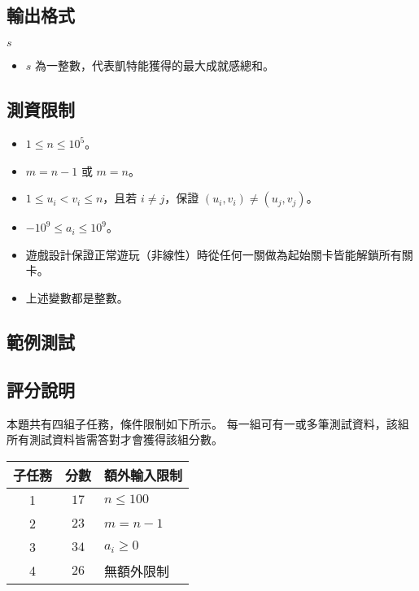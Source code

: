 \subsection{輸出格式}

\begin{format}
\f{
$s$
}
\end{format}

\begin{itemize}
\tightlist
\item
  \(s\) 為一整數，代表凱特能獲得的最大成就感總和。
\end{itemize}

\subsection{測資限制}

\begin{itemize}
\tightlist
\item
  \(1 \le n \le 10^5\)。
\item
  \(m = n-1\) 或 \(m = n\)。
\item
  \(1 \le u_i < v_i \le n\)，且若 \(i \ne j\)，保證
  \((u_i, v_i) \ne (u_j, v_j)\)。
\item
  \(-10^9 \le a_i \le 10^9\)。
\item
  遊戲設計保證正常遊玩（非線性）時從任何一關做為起始關卡皆能解鎖所有關卡。
\item
  上述變數都是整數。
\end{itemize}

\subsection{範例測試}

\begin{example}
%
%
\end{example}

\subsection{評分說明}

本題共有四組子任務，條件限制如下所示。
每一組可有一或多筆測試資料，該組所有測試資料皆需答對才會獲得該組分數。

\begin{longtable}[]{@{}ccl@{}}
\toprule
子任務 & 分數 & 額外輸入限制 \\
\midrule
\endhead
1 & \(17\) & \(n \le 100\) \\
2 & \(23\) & \(m = n-1\) \\
3 & \(34\) & \(a_i \ge 0\) \\
4 & \(26\) & 無額外限制 \\
\bottomrule
\end{longtable}

